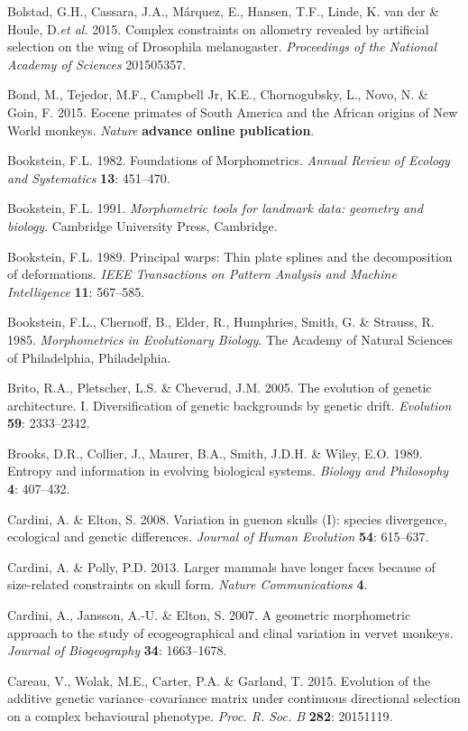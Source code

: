 \documentclass[12pt,twoside]{report}
\begin{document}
Bolstad, G.H., Cassara, J.A., Márquez, E., Hansen, T.F., Linde, K. van
der \& Houle, D.\emph{et al.} 2015. Complex constraints on allometry
revealed by artificial selection on the wing of Drosophila melanogaster.
\emph{Proceedings of the National Academy of Sciences} 201505357.

Bond, M., Tejedor, M.F., Campbell Jr, K.E., Chornogubsky, L., Novo, N.
\& Goin, F. 2015. Eocene primates of South America and the African
origins of New World monkeys. \emph{Nature} \textbf{advance online
publication}.

Bookstein, F.L. 1982. Foundations of Morphometrics. \emph{Annual Review
of Ecology and Systematics} \textbf{13}: 451--470.

Bookstein, F.L. 1991. \emph{Morphometric tools for landmark data:
geometry and biology}. Cambridge University Press, Cambridge.

Bookstein, F.L. 1989. Principal warps: Thin plate splines and the
decomposition of deformations. \emph{IEEE Transactions on Pattern
Analysis and Machine Intelligence} \textbf{11}: 567--585.

Bookstein, F.L., Chernoff, B., Elder, R., Humphries, Smith, G. \&
Strauss, R. 1985. \emph{Morphometrics in Evolutionary Biology}. The
Academy of Natural Sciences of Philadelphia, Philadelphia.

Brito, R.A., Pletscher, L.S. \& Cheverud, J.M. 2005. The evolution of
genetic architecture. I. Diversification of genetic backgrounds by
genetic drift. \emph{Evolution} \textbf{59}: 2333--2342.

Brooks, D.R., Collier, J., Maurer, B.A., Smith, J.D.H. \& Wiley, E.O.
1989. Entropy and information in evolving biological systems.
\emph{Biology and Philosophy} \textbf{4}: 407--432.

Cardini, A. \& Elton, S. 2008. Variation in guenon skulls (I): species
divergence, ecological and genetic differences. \emph{Journal of Human
Evolution} \textbf{54}: 615--637.

Cardini, A. \& Polly, P.D. 2013. Larger mammals have longer faces
because of size-related constraints on skull form. \emph{Nature
Communications} \textbf{4}.

Cardini, A., Jansson, A.-U. \& Elton, S. 2007. A geometric morphometric
approach to the study of ecogeographical and clinal variation in vervet
monkeys. \emph{Journal of Biogeography} \textbf{34}: 1663--1678.

Careau, V., Wolak, M.E., Carter, P.A. \& Garland, T. 2015. Evolution of
the additive genetic variance--covariance matrix under continuous
directional selection on a complex behavioural phenotype. \emph{Proc. R.
Soc. B} \textbf{282}: 20151119.
\end{document}
